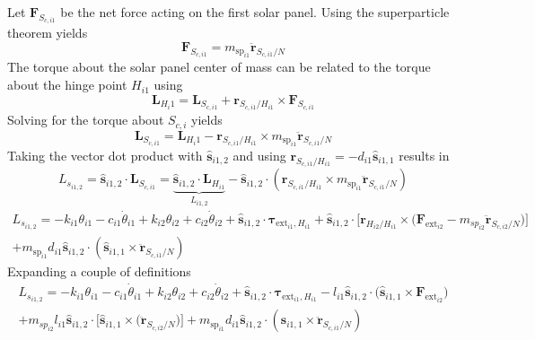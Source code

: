 \documentclass[paper]{aiaaNew}
\begin{document}
	Let $\bm F_{S_{c,i1}}$ be the net force acting on the first solar panel.  Using the superparticle theorem\cite{schaub} yields
	\begin{equation}
	\bm F_{S_{c,i1}} = m_{\text{sp}_{i1}} \ddot{\bm r}_{S_{c,i1}/N}
	\end{equation}
	The torque about the solar panel center of mass can be related to the torque about the hinge point $H_{i1}$ using
	\begin{equation}
	\bm L_{H_i1} = \bm L_{S_{c,i1}} + \bm r_{S_{c,i1}/H_{i1}} \times \bm F_{S_{c,i1}} 
	\end{equation}
	Solving for the torque about $S_{c,i}$ yields
	\begin{equation}
	\bm L_{S_{c,i1}} = \bm L_{H_i1} - \bm r_{S_{c,i1}/H_{i1}} \times m_{\text{sp}_{i1}} \ddot{\bm r}_{S_{c,i1}/N}
	\end{equation}
	Taking the vector dot product with $\hat{\bm s}_{i1,2}$ and using $\bm r_{S_{c,i1}/H_{i1}} = -d_{i1} \hat{\bm s}_{i1,1}$ results in
	\begin{equation}
	L_{s_{i1,2}} = \hat{\bm s}_{i1,2} \cdot \bm L_{S_{c,i1}} =  \underbrace{\hat{\bm s}_{i1,2} \cdot \bm L_{H_{i1}}}_{L_{i1,2}}  -  \hat{\bm s}_{i1,2} \cdot \left(
	\bm r_{S_{c,i1}/H_{i1}} \times m_{\text{sp}_{i1}} \ddot{\bm r}_{S_{c,i1}/N} \right)
	\end{equation}
	\begin{multline}
	L_{s_{i1,2}} = - k_{i1} \theta_{i1} - c_{i1}\dot{\theta}_{i1} +  k_{i2} \theta_{i2} + c_{i2} \dot\theta_{i2} + \hat{\bm s}_{i1,2} \cdot \bm \tau_{\text{ext}_{i1},H_{i1}} + \hat{\bm s}_{i1,2} \cdot \Big[\bm{r}_{H_{i2}/H_{i1}} \times \big(\bm F_{\text{ext}_{i2}}  - m_{sp_{i2}} \ddot{\bm{r}}_{S_{c,i2}/N}\big)\Big]\\
	 + m_{\text{sp}_{i1}} d_{i1} \hat{\bm s}_{i1,2} \cdot \left(\hat{\bm s}_{i1,1} \times  \ddot{\bm r}_{S_{c,i1}/N} \right)
	\end{multline}
	Expanding a couple of definitions
	\begin{multline}
	L_{s_{i1,2}} = - k_{i1} \theta_{i1} - c_{i1}\dot{\theta}_{i1} +  k_{i2} \theta_{i2} + c_{i2} \dot\theta_{i2} + \hat{\bm s}_{i1,2} \cdot \bm \tau_{\text{ext}_{i1},H_{i1}} - l_{i1} \hat{\bm s}_{i1,2} \cdot \big(\hat{\bm s}_{i1,1} \times \bm F_{\text{ext}_{i2}}\big) \\
	+ m_{sp_{i2}} l_{i1} \hat{\bm s}_{i1,2} \cdot \Big[\hat{\bm s}_{i1,1} \times \big( \ddot{\bm{r}}_{S_{c,i2}/N}\big)\Big]
	+ m_{\text{sp}_{i1}} d_{i1} \hat{\bm s}_{i1,2} \cdot \left(\hat{\bm s}_{i1,1} \times  \ddot{\bm r}_{S_{c,i1}/N} \right)
	\end{multline}
\end{document}
